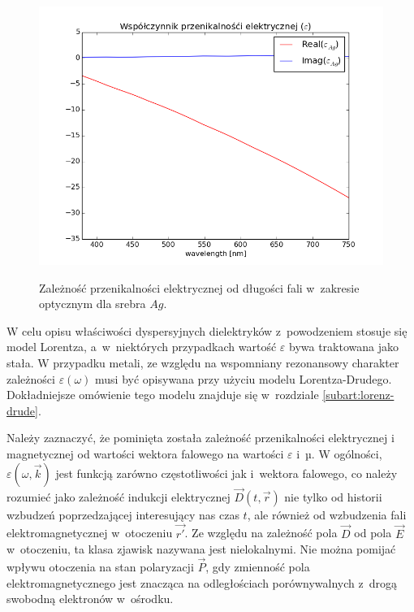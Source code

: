 \begin{figure}[tb]
	\includegraphics[width=\textwidth]{images/agtio2eps.png}
	\label{fig:agtio2eps}
	\caption{Zależność przenikalności elektrycznej od długości fali w~zakresie optycznym dla srebra $Ag$\cite{PhysRevB.6.4370}. }  
\end{figure}
W celu opisu właściwości dyspersyjnych dielektryków z~powodzeniem stosuje się model Lorentza, a~w~niektórych przypadkach wartość $\varepsilon$ bywa traktowana jako stała. W przypadku metali, ze względu na wspomniany rezonansowy charakter zależności $\varepsilon(\omega)$  musi być opisywana przy użyciu modelu Lorentza-Drudego. Dokładniejsze omówienie tego modelu znajduje się w~rozdziale \ref{subart:lorenz-drude}.

Należy zaznaczyć, że pominięta została zależność przenikalności elektrycznej i magnetycznej od wartości wektora falowego na wartości $\varepsilon$ i~µ. W ogólności, $\varepsilon(\omega,\vec{k})$ jest funkcją zarówno częstotliwości jak i~wektora falowego, co należy rozumieć jako zależność indukcji elektrycznej $\vec{D}(t,\vec{r})$ nie tylko od historii wzbudzeń poprzedzającej interesujący nas czas $t$, ale również od wzbudzenia fali elektromagnetycznej w~otoczeniu $\vec{r'}$. Ze względu na zależność pola $\vec{D}$ od pola $\vec{E}$ w~otoczeniu, ta klasa zjawisk nazywana jest nielokalnymi. Nie można pomijać wpływu otoczenia na stan polaryzacji $\vec{P}$, gdy zmienność pola elektromagnetycznego jest znacząca na odległościach porównywalnych z~drogą swobodną elektronów w~ośrodku.




